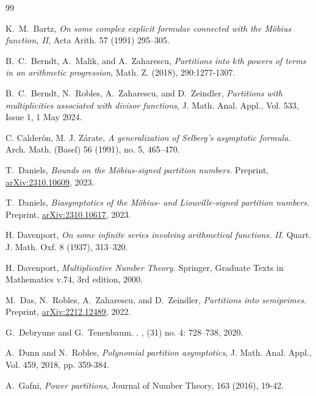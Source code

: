 \documentclass[11pt]{amsart}
\numberwithin{equation}{section}
\numberwithin{figure}{section}
\theoremstyle{definition}
\begin{document}

\begin{thebibliography}{99}

K.~M.~Bartz, \emph{On some complex explicit formulae connected with the M\"{o}bius function, \textnormal{II}}, Acta Arith. 57 (1991) 295–305.

B.~C.~Berndt, A.~Malik, and A.~Zaharescu, \emph{Partitions into $k$th powers of terms in an arithmetic progression}, Math. Z. (2018), 290:1277-1307.

B.~C.~Berndt, N.~Robles, A.~Zaharescu, and D.~Zeindler, \emph{Partitions with multiplicities associated with divisor functions}, J. Math. Anal. Appl., Vol. 533, Issue 1, 1 May 2024.

C. Calder\'on, M. J. Z\'arate, \emph{A generalization of Selberg's asymptotic formula.}
Arch. Math. (Basel) 56 (1991), no. 5, 465--470.

T.~Daniels, \emph{Bounds on the M\"{o}bius-signed partition numbers.} Preprint, \href{https://arxiv.org/abs/2310.10609 }{arXiv:2310.10609}, 2023.

T.~Daniels, \emph{Biasymptotics of the M\"{o}bius- and Liouville-signed partition numbers.} Preprint, \href{https://arxiv.org/abs/2310.10617}{arXiv:2310.10617}, 2023.

H. Davenport, \emph{On some infinite series involving arithmetical functions. \textnormal{II}}. Quart. J. Math. Oxf. 8 (1937), 313--320.

H. Davenport, \emph{Multiplicative Number Theory.} Springer, Graduate Texts in Mathematics v.74, 3rd edition, 2000.

M.~Das, N.~Robles, A.~Zaharescu, and D.~Zeindler, \emph{Partitions into semiprimes.} Preprint, \href{https://arxiv.org/abs/2212.12489}{arXiv:2212.12489}, 2022.

G.~Debryune and G.~Tenenbaum.
.
, (31) no. 4: 728--738, 2020.

A.~Dunn and N.~Robles, \emph{Polynomial partition asymptotics}, J. Math. Anal. Appl., Vol. 459, 2018, pp. 359-384.

A.~Gafni, \emph{Power partitions}, Journal of Number Theory, 163 (2016), 19-42.


\end{thebibliography}
\end{document}
